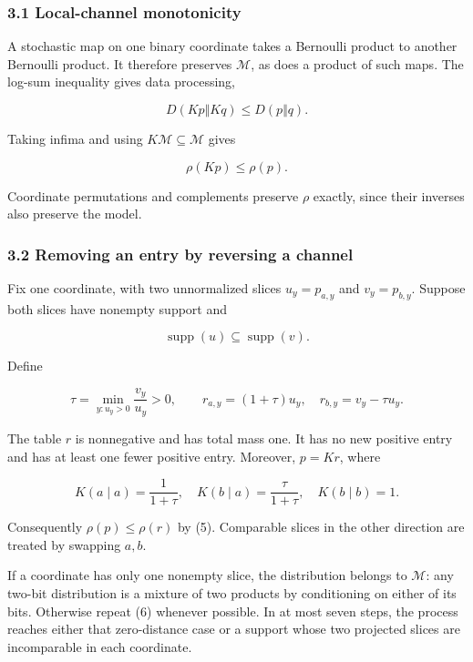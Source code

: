 \subsubsection{3.1 Local-channel
monotonicity}\label{local-channel-monotonicity}

A stochastic map on one binary coordinate takes a Bernoulli product to
another Bernoulli product. It therefore preserves \(\mathcal M\), as
does a product of such maps. The log-sum inequality gives data
processing,

\[
D(Kp\Vert Kq)\le D(p\Vert q).
\]

Taking infima and using \(K\mathcal M\subseteq\mathcal M\) gives

\[
\rho(Kp)\le\rho(p).
\tag{5}
\]

Coordinate permutations and complements preserve \(\rho\) exactly, since
their inverses also preserve the model.

\subsubsection{3.2 Removing an entry by reversing a
channel}\label{removing-an-entry-by-reversing-a-channel}

Fix one coordinate, with two unnormalized slices \(u_y=p_{a,y}\) and
\(v_y=p_{b,y}\). Suppose both slices have nonempty support and

\[
\operatorname{supp}(u)\subseteq\operatorname{supp}(v).
\]

Define

\[
\tau=\min_{y:u_y>0}\frac{v_y}{u_y}>0,
\qquad r_{a,y}=(1+\tau)u_y,\quad r_{b,y}=v_y-\tau u_y.
\tag{6}
\]

The table \(r\) is nonnegative and has total mass one. It has no new
positive entry and has at least one fewer positive entry. Moreover,
\(p=Kr\), where

\[
K(a\mid a)=\frac1{1+\tau},\quad
K(b\mid a)=\frac\tau{1+\tau},\quad K(b\mid b)=1.
\tag{7}
\]

Consequently \(\rho(p)\le\rho(r)\) by (5). Comparable slices in the
other direction are treated by swapping \(a,b\).

If a coordinate has only one nonempty slice, the distribution belongs to
\(\mathcal M\): any two-bit distribution is a mixture of two products by
conditioning on either of its bits. Otherwise repeat (6) whenever
possible. In at most seven steps, the process reaches either that
zero-distance case or a support whose two projected slices are
incomparable in each coordinate.

